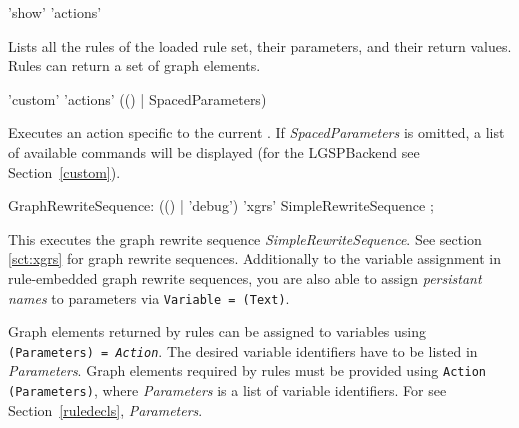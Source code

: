 \begin{rail}
  'show' 'actions'
\end{rail}
Lists all the rules of the loaded rule set, their parameters, and their return values. Rules can return a set of graph elements.

\begin{rail}
  'custom' 'actions' (() | SpacedParameters)
\end{rail}
Executes an action specific to the current . If \emph{SpacedParameters} is omitted, a list of available commands will be displayed (for the LGSPBackend see Section~\ref{custom}).

\makeatletter
\begin{rail}
  GraphRewriteSequence: (() | 'debug') 'xgrs' SimpleRewriteSequence ;
\end{rail}
This executes the graph rewrite sequence \emph{SimpleRewriteSequence}.
See section \ref{sct:xgrs} for graph rewrite sequences.
Additionally to the variable assignment in rule-embedded graph rewrite sequences, you are also able to assign \emph{persistant names} to parameters via  \texttt{Variable = \@(Text)}.

Graph elements returned by rules can be assigned to variables using \texttt{(Para\-meters) = \emph{Action}}. 
The desired variable identifiers have to be listed in \emph{Parameters}. 
Graph elements required by rules must be provided using \texttt{Action (Para\-meters)}, where \emph{Parameters} is a list of variable identifiers. 
For  see Section~\ref{ruledecls}, \emph{Parameters}.

